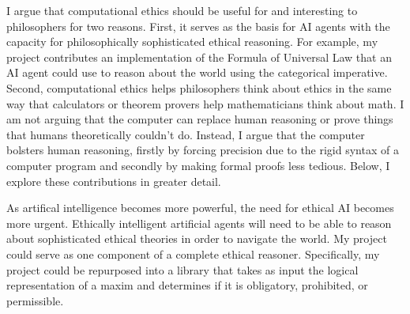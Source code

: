 %
\begin{isabellebody}%
%
%
\isadelimtheory
%
\endisadelimtheory
%
\isatagtheory
%
\endisatagtheory
{\isafoldtheory}%
%
\isadelimtheory
%
\endisadelimtheory
%
\isadelimdocument
%
\endisadelimdocument
%
\isatagdocument
%
\isamarkuptrue%
%
\endisatagdocument
{\isafolddocument}%
%
\isadelimdocument
%
\endisadelimdocument
%
\begin{isamarkuptext}%
I argue that computational ethics should be useful for and interesting to philosophers for two 
reasons. First, it serves as the basis for AI agents with the capacity for philosophically sophisticated 
ethical reasoning. For example, my project contributes an implementation of the Formula of Universal Law
that an AI agent could use to reason about the world using the categorical imperative. Second, computational 
ethics helps philosophers think about ethics in the same way that calculators or theorem provers help 
mathematicians think about math. I am not arguing that the computer can replace human reasoning or prove things
that humans theoretically couldn't do. Instead, I argue that the computer bolsters human reasoning, firstly by forcing precision due to 
the rigid syntax of a computer program and secondly by making formal proofs less tedious. Below, I explore 
these contributions in greater detail.%
\end{isamarkuptext}\isamarkuptrue%
%
\isadelimdocument
%
\endisadelimdocument
%
\isatagdocument
%
\isamarkuptrue%
%
\endisatagdocument
{\isafolddocument}%
%
\isadelimdocument
%
\endisadelimdocument
%
\begin{isamarkuptext}%
As artifical intelligence becomes more powerful, the need for ethical AI becomes more urgent.
 Ethically intelligent artificial agents will need to 
be able to reason about sophisticated ethical theories in order to navigate the world. My project could 
serve as one component of a complete ethical reasoner. Specifically, my project could be repurposed 
into a library that takes as input the logical representation of a maxim and determines if it is obligatory, prohibited, 
or permissible.


\end{isamarkuptext}
\end{isabellebody}
